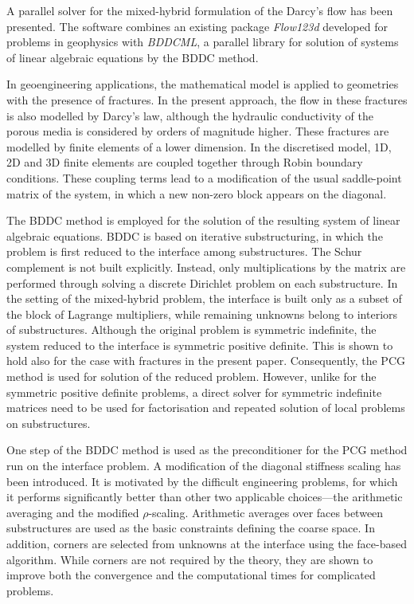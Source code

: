 A parallel solver for the mixed-hybrid formulation of the Darcy's flow has
been presented. The software combines an existing package \textsl{Flow123d}
developed for problems in geophysics with \textsl{BDDCML}, a parallel library
for solution of systems of linear algebraic equations by the BDDC method.

In geoengineering applications, the mathematical model is applied to
geometries with the presence of fractures. In the present approach, the flow
in these fractures is also modelled by Darcy's law, although the hydraulic
conductivity of the porous media is considered by orders of magnitude higher.
These fractures are modelled by finite elements of a lower dimension. In the
discretised model, 1D, 2D and 3D finite elements are coupled together through
Robin boundary conditions. These coupling terms lead to a modification of the
usual saddle-point matrix of the system, in which a new non-zero block appears
on the diagonal.

The BDDC method is employed for the solution of the resulting system of linear
algebraic equations. BDDC is based on iterative substructuring, in which the
problem is first reduced to the interface among substructures. The Schur
complement is not built explicitly. Instead, only multiplications by the
matrix are performed through solving a discrete Dirichlet problem on each
substructure. In the setting of the mixed-hybrid problem, the interface is
built only as a subset of the block of Lagrange multipliers, while remaining
unknowns belong to interiors of substructures. Although the original problem
is symmetric indefinite, the system reduced to the interface is symmetric
positive definite. This is shown to hold also for the case with fractures in
the present paper. Consequently, the PCG method is used for solution of the
reduced problem. However, unlike for the symmetric positive definite problems,
a direct solver for symmetric indefinite matrices need to be used for
factorisation and repeated solution of local problems on substructures.

One step of the BDDC method is used as the preconditioner for the PCG method
run on the interface problem. A modification of the diagonal stiffness scaling
has been introduced. It is motivated by the difficult engineering problems,
for which it performs significantly better than other two applicable
choices---the arithmetic averaging and the modified $\rho$-scaling. Arithmetic
averages over faces between substructures are used as the basic constraints
defining the coarse space. 
In addition, corners are selected 
from unknowns at the interface 
using the face-based algorithm.
While corners are not
required by the theory, they are shown to improve both the convergence and the
computational times for complicated problems.

